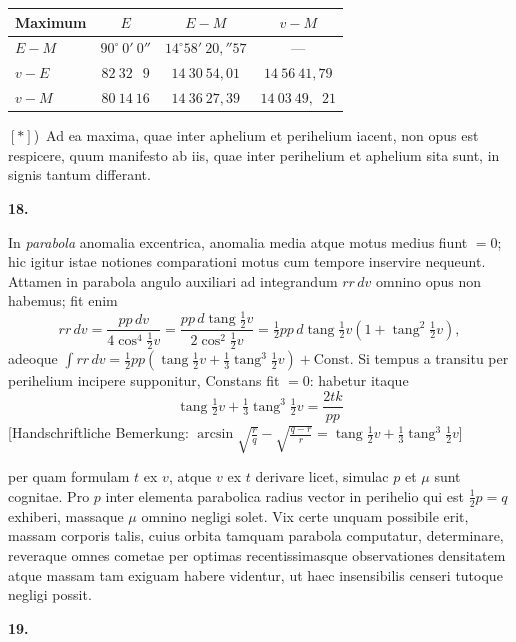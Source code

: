 \documentclass[12pt,a4paper]{book}
\newcommand{\tang}{\operatorname{tang}}
\newcommand{\Const}{\mathrm{Const}}
\begin{document}
\begin{center}
\begin{tabular}{@{}l|c|c|c@{}}
\textbf{Maximum} & $E$ & $E-M$ & $v-M$ \\
\hline
$E-M$ & $90^{\circ}\ 0'\ 0''$ & $14^{\circ}58'\ 20{,}''57$ & --- \\
$v-E$ & $82\ 32\ \phantom{0}9$ & $14\ 30\ 54{,}01$ & $14\ 56\ 41{,}79$ \\
$v-M$ & $80\ 14\ 16$ & $14\ 36\ 27{,}39$ & $14\ 03\ 49{,}\phantom{0}21$
\end{tabular}
\end{center}

\medskip
$[*]$)\ Ad ea maxima, quae inter aphelium et perihelium iacent, non opus est respicere, quum manifesto ab iis, quae inter perihelium et aphelium sita sunt, in signis tantum differant.

\textbf{18.}

In \textit{parabola} anomalia excentrica, anomalia media atque motus medius fiunt $=0$; hic igitur istae notiones comparationi motus cum tempore inservire nequeunt. Attamen in parabola angulo auxiliari ad integrandum $rr\,dv$ omnino opus non habemus; fit enim
\[
rr\,dv=\frac{pp\,dv}{4\cos^{4}\tfrac{1}{2}v}=\frac{pp\,d\tang\tfrac{1}{2}v}{2\cos^{2}\tfrac{1}{2}v}=\tfrac{1}{2}pp\,d\tang\tfrac{1}{2}v(1+\tang^{2}\tfrac{1}{2}v),
\]
adeoque $\int rr\,dv=\tfrac{1}{2}pp(\tang\tfrac{1}{2}v+\tfrac{1}{3}\tang^{3}\tfrac{1}{2}v)+\Const$. Si tempus a transitu per perihelium incipere supponitur, Constans fit $=0$: habetur itaque
\[
\tang\tfrac{1}{2}v+\tfrac{1}{3}\tang^{3}\tfrac{1}{2}v=\frac{2tk}{pp}
\]
[Handschriftliche Bemerkung:
$\arcsin\sqrt{\frac{r}{q}}-\sqrt{\frac{q-r}{r}}=\tang\tfrac{1}{2}v+\tfrac{1}{3}\tang^{3}\tfrac{1}{2}v$]

per quam formulam $t$ ex $v$, atque $v$ ex $t$ derivare licet, simulac $p$ et $\mu$ sunt cognitae. Pro $p$ inter elementa parabolica radius vector in perihelio qui est $\tfrac{1}{2}p=q$ exhiberi, massaque $\mu$ omnino negligi solet. Vix certe unquam possibile erit, massam corporis talis, cuius orbita tamquam parabola computatur, determinare, reveraque omnes cometae per optimas recentissimasque observationes densitatem atque massam tam exiguam habere videntur, ut haec insensibilis censeri tutoque negligi possit.

\textbf{19.}
\end{document}
